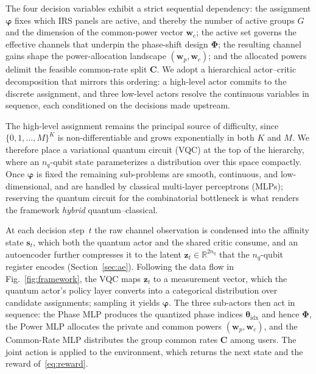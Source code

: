 \documentclass[12pt,onecolumn]{IEEEtran}
\begin{document}
The four decision variables exhibit a strict sequential dependency: the assignment $\boldsymbol{\varphi}$ fixes which IRS panels are active, and thereby the number of active groups $G$ and the dimension of the common-power vector $\mathbf{w}_c$; the active set governs the effective channels that underpin the phase-shift design $\boldsymbol{\Phi}$; the resulting channel gains shape the power-allocation landscape $(\mathbf{w}_p,\mathbf{w}_c)$; and the allocated powers delimit the feasible common-rate split $\mathbf{C}$.
We adopt a hierarchical actor--critic decomposition that mirrors this ordering: a high-level actor commits to the discrete assignment, and three low-level actors resolve the continuous variables in sequence, each conditioned on the decisions made upstream.

The high-level assignment remains the principal source of difficulty, since $\{0,1,\ldots,M\}^K$ is non-differentiable and grows exponentially in both $K$ and $M$. 
We therefore place a variational quantum circuit (VQC) at the top of the hierarchy, where an $n_q$-qubit state parameterizes a distribution over this space compactly.
Once $\boldsymbol{\varphi}$ is fixed the remaining sub-problems are smooth, continuous, and low-dimensional, and are handled by classical multi-layer perceptrons (MLPs); reserving the quantum circuit for the combinatorial bottleneck is what renders the framework \emph{hybrid} quantum--classical.





At each decision step~$t$ the raw channel observation is condensed into the affinity state $\mathbf{s}_t$, which both the quantum actor and the shared critic consume, and an autoencoder further compresses it to the latent $\mathbf{z}_t\in\mathbb{R}^{2n_q}$ that the $n_q$-qubit register encodes (Section~\ref{sec:ae}). Following the data flow in Fig.~\ref{fig:framework}, the VQC maps $\mathbf{z}_t$ to a measurement vector, which the quantum actor's policy layer converts into a categorical distribution over candidate assignments; sampling it yields $\boldsymbol{\varphi}$. The three sub-actors then act in sequence: the Phase MLP produces the quantized phase indices $\boldsymbol{\theta}_{\mathrm{idx}}$ and hence $\boldsymbol{\Phi}$, the Power MLP allocates the private and common powers $(\mathbf{w}_p,\mathbf{w}_c)$, and the Common-Rate MLP distributes the group common rates $\mathbf{C}$ among users. The joint action is applied to the environment, which returns the next state and the reward of~\eqref{eq:reward}.
\end{document}
